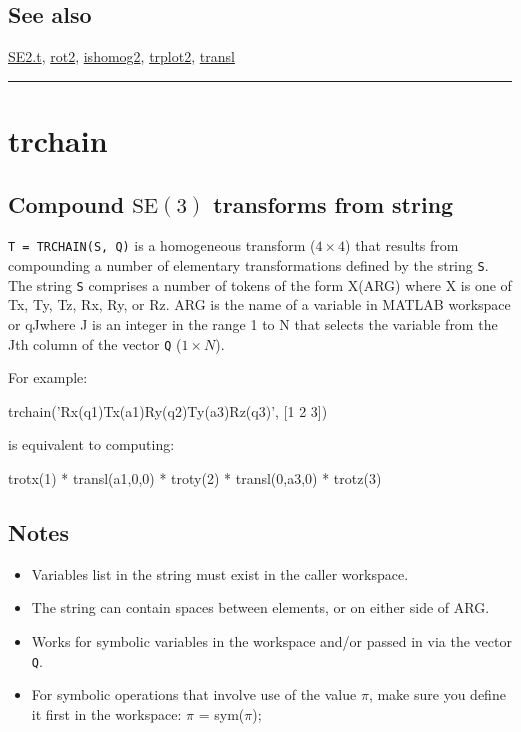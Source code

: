 \subsection*{See also}


\hyperlink{SE2.t}{\color{blue} SE2.t}, \hyperlink{rot2}{\color{blue} rot2}, \hyperlink{ishomog2}{\color{blue} ishomog2}, \hyperlink{trplot2}{\color{blue} trplot2}, \hyperlink{transl}{\color{blue} transl}

\vspace{1.5ex}\rule{\textwidth}{1mm}

\hypertarget{trchain}{\section*{trchain}}
\subsection*{Compound $\mbox{SE}(3)$ transforms from string}


\texttt{T = TRCHAIN(S, Q)} is a homogeneous transform ($4 \times 4$) that results from
compounding a number of elementary transformations defined by the string
\texttt{S}.  The string \texttt{S} comprises a number of tokens of the form X(ARG) where
X is one of Tx, Ty, Tz, Rx, Ry, or Rz.  ARG is the name of a variable in
MATLAB workspace or \textquotesingle qJ\textquotesingle  where J is an integer in the range 1 to N that
selects the variable from the Jth column of the vector \texttt{Q} ($1 \times N$).



For example:

\begin{Code}
  trchain('Rx(q1)Tx(a1)Ry(q2)Ty(a3)Rz(q3)', [1 2 3])

\end{Code}


is equivalent to computing:

\begin{Code}
  trotx(1) * transl(a1,0,0) * troty(2) * transl(0,a3,0) * trotz(3)

\end{Code}

\subsection*{Notes}
\begin{itemize}
  \item Variables list in the string must exist in the caller workspace.
  \item The string can contain spaces between elements, or on either side of ARG.
  \item Works for symbolic variables in the workspace and/or passed in via the    vector \texttt{Q}.
  \item For symbolic operations that involve use of the value $\pi$, make sure you    define it first in the workspace: $\pi$ = sym(\textquotesingle $\pi$\textquotesingle );
\end{itemize}

